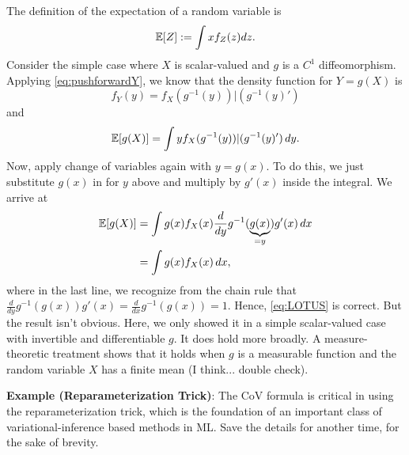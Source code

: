 The definition of the expectation of a random variable is
$$
\mathbb{E}[Z] := \int x f_Z(z) dz. 
$$
Consider the simple case where $X$ is scalar-valued and $g$ is a $C^1$ diffeomorphism. Applying \eqref{eq:pushforwardY}, we know that the density function for $Y = g(X)$ is
$$
f_Y(y) = f_X(g^{-1}(y)) |(g^{-1}(y)')
$$
and 
$$
\mathbb{E}[g(X)] = \int y f_X(g^{-1}(y)) |(g^{-1}(y)') \, dy. 
$$
Now, apply change of variables again with $y = g(x)$. To do this, we just substitute $g(x)$ in for $y$ above and multiply by $g'(x)$ inside the integral. We arrive at
\begin{align}
\mathbb{E}[g(X)] & = \int g(x) f_X(x) \frac{d}{dy} g^{-1}(\underbrace{g(x)}_{=y}) g'(x) \, dx\\
& = \int g(x) f_X(x) \, dx,
\end{align}
where in the last line, we recognize from the chain rule that $\frac{d}{dy} g^{-1}(g(x)) g'(x)  = \frac{d}{dx} g^{-1}(g(x)) = 1$. 
Hence, \eqref{eq:LOTUS} is correct. But the result isn't obvious. Here, we only showed it in a simple scalar-valued case with invertible and differentiable $g$. It does hold more broadly. A measure-theoretic treatment shows that it holds when $g$ is a measurable function and the random variable $X$ has a finite mean (I think... double check). 

\vspace{1em} \noindent
\textbf{Example (Reparameterization Trick)}: The CoV formula is critical in using the reparameterization trick, which is the foundation of an important class of variational-inference based methods in ML. Save the details for another time, for the sake of brevity. 

